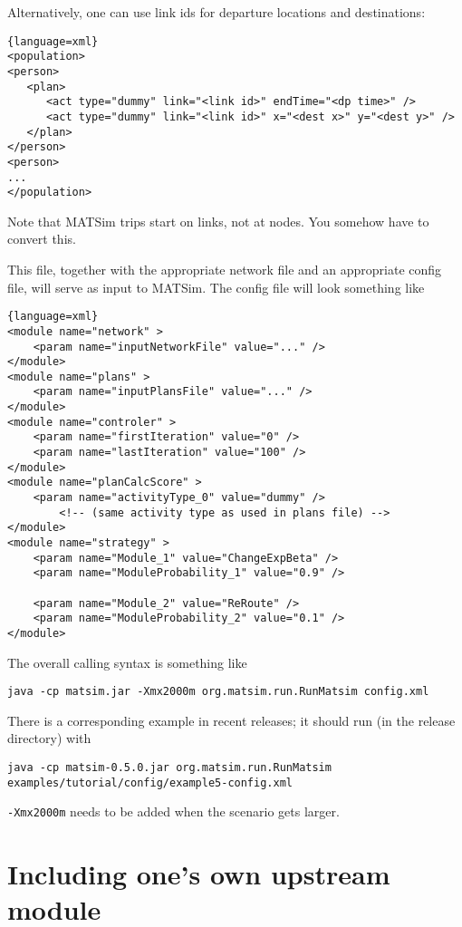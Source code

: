 Alternatively, one can use link ids for departure locations and destinations:
\begin{lstlisting}{language=xml}
<population>
<person>
   <plan>
      <act type="dummy" link="<link id>" endTime="<dp time>" />
      <act type="dummy" link="<link id>" x="<dest x>" y="<dest y>" />
   </plan>
</person>
<person>
...
</population>
\end{lstlisting}

Note that MATSim trips start on links, not at nodes.  You somehow have to convert this.

This file, together with the appropriate network file and an appropriate config file, will serve as input to MATSim.  The config file will look something like
\begin{lstlisting}{language=xml}
<module name="network" >
	<param name="inputNetworkFile" value="..." /> 
</module>
<module name="plans" >
	<param name="inputPlansFile" value="..." />
</module>
<module name="controler" >
	<param name="firstIteration" value="0" />
	<param name="lastIteration" value="100" />
</module>
<module name="planCalcScore" >
	<param name="activityType_0" value="dummy" />
        <!-- (same activity type as used in plans file) -->
</module>
<module name="strategy" >
	<param name="Module_1" value="ChangeExpBeta" />
	<param name="ModuleProbability_1" value="0.9" />

	<param name="Module_2" value="ReRoute" />
	<param name="ModuleProbability_2" value="0.1" />
</module>
\end{lstlisting}

The overall calling syntax is something like
\begin{lstlisting}
java -cp matsim.jar -Xmx2000m org.matsim.run.RunMatsim config.xml
\end{lstlisting}

There is a corresponding example in recent releases; it should run (in the release directory) with 
\begin{lstlisting}
java -cp matsim-0.5.0.jar org.matsim.run.RunMatsim examples/tutorial/config/example5-config.xml
\end{lstlisting}
\verb$-Xmx2000m$ needs to be added when the scenario gets larger.

\section{Including one's own upstream module}
\label{sec:including-ones-own}

